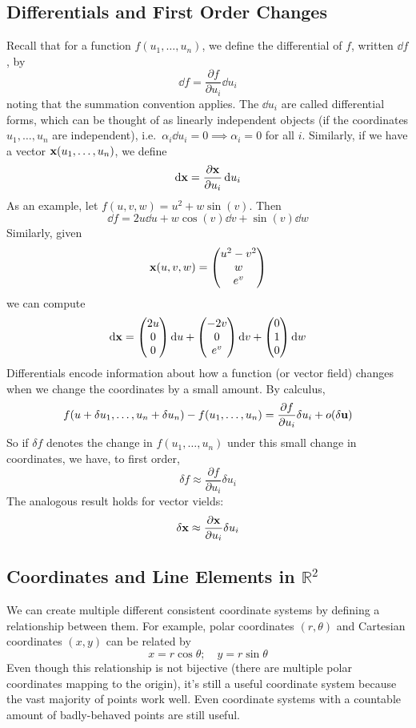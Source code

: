 \subsection{Differentials and First Order Changes}
Recall that for a function \(f(u_1, \dots, u_n)\), we define the differential of \(f\), written \(\dd{f}\), by
\[
	\dd{f} = \frac{\partial f}{\partial u_i} \dd{u}_i
\]
noting that the summation convention applies.
The \(\dd{u}_i\) are called differential forms, which can be thought of as linearly independent objects (if the coordinates \(u_1, \dots, u_n\) are independent), i.e.\ \(\alpha_i \dd{u}_i = 0 \implies \alpha_i = 0\) for all \(i\).
Similarly, if we have a vector \(\vb x(u_1, \dots, u_n)\), we define
\[
	\dd \vb x = \frac{\partial \vb x}{\partial u_i} \dd{u}_i
\]
As an example, let \(f(u, v, w) = u^2 + w \sin(v)\).
Then
\[
	\dd{f} = 2u \dd{u} + w \cos(v) \dd{v} + \sin(v) \dd{w}
\]
Similarly, given
\[
	\vb x(u, v, w) = \begin{pmatrix}
		u^2 - v^2 \\ w \\ e^v
	\end{pmatrix}
\]
we can compute
\[
	\dd \vb x = \begin{pmatrix}
		2u \\ 0 \\ 0
	\end{pmatrix} \dd{u} + \begin{pmatrix}
		-2v \\ 0 \\ e^v
	\end{pmatrix} \dd{v} + \begin{pmatrix}
		0 \\ 1 \\ 0
	\end{pmatrix} \dd{w}
\]
Differentials encode information about how a function (or vector field) changes when we change the coordinates by a small amount.
By calculus,
\[
	f(u + \delta u_1, \dots, u_n + \delta u_n) - f(u_1, \dots, u_n) = \frac{\partial f}{\partial u_i} \delta u_i + o(\delta \vb u)
\]
So if \(\delta f\) denotes the change in \(f(u_1, \dots, u_n)\) under this small change in coordinates, we have, to first order,
\[
	\delta f \approx \frac{\partial f}{\partial u_i}\delta u_i
\]
The analogous result holds for vector vields:
\[
	\delta \vb x \approx \frac{\partial \vb x}{\partial u_i}\delta u_i
\]

\subsection{Coordinates and Line Elements in \(\mathbb R^2\)}
We can create multiple different consistent coordinate systems by defining a relationship between them.
For example, polar coordinates \((r, \theta)\) and Cartesian coordinates \((x, y)\) can be related by
\[
	x = r \cos \theta;\quad y = r \sin \theta
\]
Even though this relationship is not bijective (there are multiple polar coordinates mapping to the origin), it's still a useful coordinate system because the vast majority of points work well.
Even coordinate systems with a countable amount of badly-behaved points are still useful.

